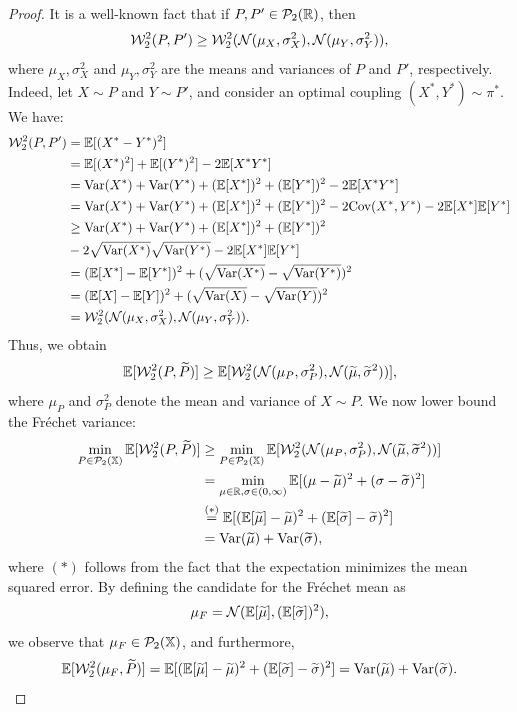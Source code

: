 \begin{proof}
It is a well-known fact that if $P, P' \in \mathcal{P}_2(\mathbb{R})$, then 
\[
\mathcal{W}_2^2(P, P') \geq \mathcal{W}_2^2(\mathcal{N}(\mu_X, \sigma^2_X), \mathcal{N}(\mu_Y, \sigma^2_Y)),
\]
where $\mu_X, \sigma^2_X$ and $\mu_Y, \sigma^2_Y$ are the means and variances of $P$ and $P'$, respectively. Indeed, let $X \sim P$ and $Y \sim P'$, and consider an optimal coupling $(X^*, Y^*) \sim \pi^*$. We have:
\begin{align*}
    \mathcal{W}_2^2(P, P') & = \mathbb{E} [(X^* - Y^*)^2] \\
    & = \mathbb{E} [(X^*)^2] + \mathbb{E} [(Y^*)^2] - 2\mathbb{E} [X^*Y^*] \\
    & = \mathrm{Var}(X^*) + \mathrm{Var}(Y^*) + (\mathbb{E} [X^*])^2 + (\mathbb{E} [Y^*])^2 - 2\mathbb{E} [X^*Y^*] \\
    & = \mathrm{Var}(X^*) + \mathrm{Var}(Y^*) + (\mathbb{E} [X^*])^2 + (\mathbb{E} [Y^*])^2 - 2\mathrm{Cov}(X^*, Y^*) - 2\mathbb{E} [X^*]\mathbb{E} [Y^*] \\
    & \geq \mathrm{Var}(X^*) + \mathrm{Var}(Y^*) + (\mathbb{E} [X^*])^2 + (\mathbb{E} [Y^*])^2  \\
    & - 2\sqrt{\mathrm{Var}(X^*)}\sqrt{\mathrm{Var}(Y^*)} - 2\mathbb{E} [X^*]\mathbb{E} [Y^*] \\
    & = (\mathbb{E} [X^*] - \mathbb{E} [Y^*])^2 + (\sqrt{\mathrm{Var}(X^*)} - \sqrt{\mathrm{Var}(Y^*)})^2 \\
    & = (\mathbb{E} [X] - \mathbb{E} [Y])^2 + (\sqrt{\mathrm{Var}(X)} - \sqrt{\mathrm{Var}(Y)})^2 \\
    & = \mathcal{W}_2^2(\mathcal{N}(\mu_X, \sigma^2_X), \mathcal{N}(\mu_Y, \sigma^2_Y)).
\end{align*}
Thus, we obtain
\[
\mathbb{E} [\mathcal{W}_2^2(P, \widetilde{P})] \geq \mathbb{E} [\mathcal{W}_2^2(\mathcal{N}(\mu_P, \sigma^2_P), \mathcal{N}(\widetilde{\mu}, \widetilde{\sigma}^2))],
\]
where $\mu_P$ and $\sigma^2_P$ denote the mean and variance of $X \sim P$. We now lower bound the Fr\'{e}chet variance:
\begin{align*}
    \min_{P \in \mathcal{P}_2(\mathbb{X})} \mathbb{E} [\mathcal{W}_2^2(P, \widetilde{P})] & \geq 
    \min_{P \in \mathcal{P}_2(\mathbb{X})} \mathbb{E} [\mathcal{W}_2^2(\mathcal{N}(\mu_P, \sigma^2_P), \mathcal{N}(\widetilde{\mu}, \widetilde{\sigma}^2))] \\
    & = \min_{\mu \in \mathbb{R}, \sigma \in (0,\infty)} \mathbb{E} [(\mu - \widetilde{\mu})^2 + (\sigma - \widetilde{\sigma})^2] \\
    & \overset{(*)}{=} \mathbb{E} [(\mathbb{E}[\widetilde{\mu}] - \widetilde{\mu})^2 + (\mathbb{E}[\widetilde{\sigma}] - \widetilde{\sigma})^2]  \\
    & = \mathrm{Var}(\widetilde{\mu}) + \mathrm{Var}(\widetilde{\sigma}),
\end{align*}
where $(*)$ follows from the fact that the expectation minimizes the mean squared error. By defining the candidate for the Fr\'{e}chet mean as
\[
\mu_F = \mathcal{N}(\mathbb{E}[\widetilde{\mu}], (\mathbb{E} [\widetilde{\sigma}])^2),
\]
we observe that $\mu_F \in \mathcal{P}_2(\mathbb{X})$, and furthermore,
\[
\mathbb{E} [\mathcal{W}_2^2(\mu_F, \widetilde{P})] = \mathbb{E} [(\mathbb{E}[\widetilde{\mu}] - \widetilde{\mu})^2 + (\mathbb{E}[\widetilde{\sigma}] - \widetilde{\sigma})^2] = \mathrm{Var}(\widetilde{\mu}) + \mathrm{Var}(\widetilde{\sigma}).
\]
\end{proof}

